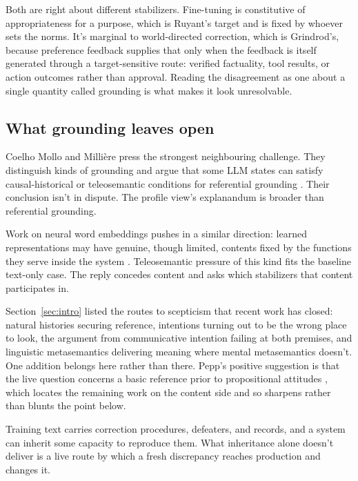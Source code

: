 \documentclass[12pt]{article}
\begin{document}
Both are right about different stabilizers. Fine-tuning is constitutive of
appropriateness for a purpose, which is Ruyant's target and is fixed by whoever sets the
norms. It's marginal to world-directed correction, which is Grindrod's, because preference
feedback supplies that only when the feedback is itself generated through a
target-sensitive route: verified factuality, tool results, or action outcomes rather than
approval. Reading the disagreement as one about a single quantity called grounding is
what makes it look unresolvable.

\subsection{What grounding leaves open}

Coelho Mollo and Millière press the strongest neighbouring challenge. They distinguish
kinds of grounding and argue that some LLM states can satisfy causal-historical or
teleosemantic conditions for referential grounding
\citep{coelho_mollo_milliere_2026_vector_grounding_problem}. Their conclusion isn't in
dispute. The profile view's explanandum is broader than referential grounding.

Work on neural word embeddings pushes in a similar direction: learned representations
may have genuine, though limited, contents fixed by the functions they serve inside the
system \citep{mallory_2026_teleosemantics_word_embeddings}.
Teleosemantic pressure of this kind fits the baseline text-only case. The reply concedes content and
asks which stabilizers that content participates in.

Section~\ref{sec:intro} listed the routes to scepticism that recent work has closed:
natural histories securing reference, intentions turning out to be the wrong place to
look, the argument from communicative intention failing at both premises, and linguistic
metasemantics delivering meaning where mental metasemantics doesn't. One addition belongs
here rather than there. Pepp's positive suggestion is that the live question concerns a
basic reference prior to propositional attitudes
\citep{pepp_2025_reference_without_intentions_llms}, which locates the remaining work on
the content side and so sharpens rather than blunts the point below.

Training text carries correction procedures,
defeaters, and records, and a system can inherit some capacity to reproduce them. What
inheritance alone doesn't deliver is a live route by which a fresh discrepancy reaches
production and changes it.
\end{document}
